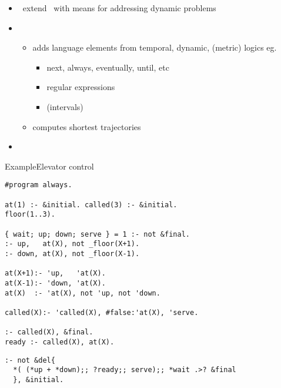 \begin{frame}{\telingo}
  \begin{itemize}
  \item {} \ extend \clingo\ with means for addressing dynamic problems
  \item {} \
    \begin{itemize}
    \item adds language elements from temporal, dynamic, (metric) logics
      eg.\
      \begin{itemize}\small
      \item next, always, eventually, until, etc
      \item regular expressions
      \item (intervals)
      \end{itemize}
    \item computes shortest trajectories
    \end{itemize}
  \item {} \ \cite{cakamosc19a,cadilasc20a}
  \end{itemize}
\end{frame}
\begin{frame}[fragile,shrink]{Example}{Elevator control}
\begin{lstlisting}[language=clingo,basicstyle=\small\ttfamily]
#program always.

at(1) :- &initial. called(3) :- &initial.
floor(1..3).

{ wait; up; down; serve } = 1 :- not &final.
:- up,   at(X), not _floor(X+1).
:- down, at(X), not _floor(X-1).

at(X+1):- 'up,   'at(X).
at(X-1):- 'down, 'at(X).
at(X)  :- 'at(X), not 'up, not 'down.

called(X):- 'called(X), #false:'at(X), 'serve.

:- called(X), &final.
ready :- called(X), at(X).
\end{lstlisting}
\pause
\begin{lstlisting}[language=clingo,basicstyle=\small\ttfamily]
:- not &del{
  *( (*up + *down);; ?ready;; serve);; *wait .>? &final
  }, &initial.
\end{lstlisting}
\end{frame}
%
